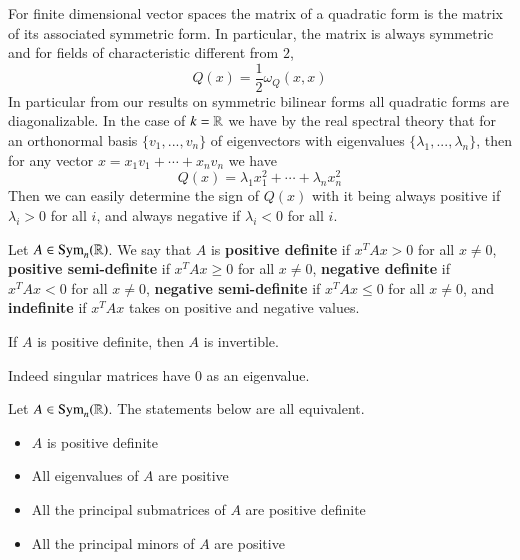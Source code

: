 For finite dimensional vector spaces the matrix of a quadratic form is the matrix of its associated symmetric form. In particular, the matrix is always symmetric and for fields of characteristic different from $2$, \begin{equation*}
    Q(x) = \frac{1}{2}\omega_Q(x,x)
\end{equation*}
In particular from our results on symmetric bilinear forms all quadratic forms are diagonalizable. In the case of $k = \mathbb R$ we have by the real spectral theory that for an orthonormal basis $\{v_1,...,v_n\}$ of eigenvectors with eigenvalues $\{\lambda_1,...,\lambda_n\}$, then for any vector $x = x_1v_1+\cdots+x_nv_n$ we have \begin{equation*}
    Q(x) = \lambda_1x_1^2+\cdots +\lambda_nx_n^2
\end{equation*}
Then we can easily determine the sign of $Q(x)$ with it being always positive if $\lambda_i > 0$ for all $i$, and always negative if $\lambda_i < 0$ for all $i$.

\begin{definition}
    Let $A \in \text{Sym}_n(\mathbb R)$. We say that $A$ is \textbf{positive definite} if $x^TAx > 0$ for all $x \neq 0$, \textbf{positive semi-definite} if $x^TAx \geq 0$ for all $x \neq 0$, \textbf{negative definite} if $x^TAx < 0$ for all $x \neq 0$, \textbf{negative semi-definite} if $x^TAx \leq 0$ for all $x \neq 0$, and \textbf{indefinite} if $x^TAx$ takes on positive and negative values.
\end{definition}

\begin{theorem}
    If $A$ is positive definite, then $A$ is invertible.
\end{theorem}

Indeed singular matrices have $0$ as an eigenvalue.

\begin{theorem}
    Let $A \in \text{Sym}_n(\mathbb R)$. The statements below are all equivalent. \begin{itemize}
        \item $A$ is positive definite
        \item All eigenvalues of $A$ are positive
        \item All the principal submatrices of $A$ are positive definite
        \item All the principal minors of $A$ are positive
    \end{itemize}
\end{theorem}

